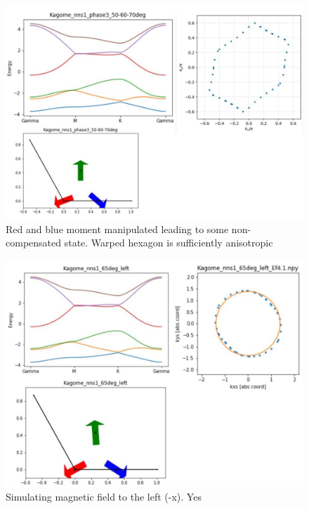 \documentclass[prb,showpacs,amsmath,amssymb,superscriptaddress,twocolumn,floatfix]{revtex4-1}
\begin{document}
\begin{appendix}
\begin{figure}
	\centering
	\includegraphics[width=0.7\linewidth]{img_total/total_Kagome_phase3_50-60-70}
	\caption{Red and blue moment manipulated leading to some non-compensated state. Warped hexagon is sufficiently anisotropic}
	\label{fig:totalkagomephase350-60-70}
\end{figure}

\begin{figure}
	\centering
	\includegraphics[width=0.7\linewidth]{img_total/total_Kagome_phase3_65L}
	\caption{Simulating magnetic field to the left (-x). Yes}
	\label{fig:totalkagomephase365l}
\end{figure}



\end{appendix}

\def\urlprefix{}
\def\url#1{}
\end{document}
